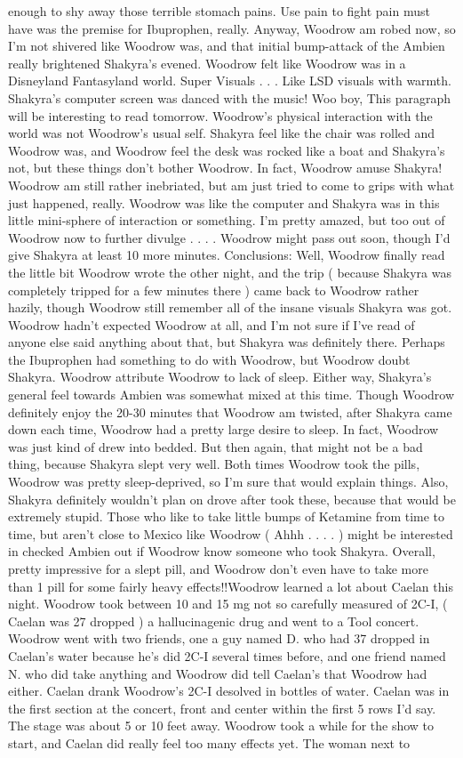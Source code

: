 \documentclass[12pt]{book}
\begin{document}
enough to shy away those terrible stomach pains. Use pain to fight pain must have was the premise for Ibuprophen, really. Anyway, Woodrow am robed now, so I'm not shivered like Woodrow was, and that initial bump-attack of the Ambien really brightened Shakyra's evened. Woodrow felt like Woodrow was in a Disneyland Fantasyland world. Super Visuals . . .  Like LSD visuals with warmth. Shakyra's computer screen was danced with the music! Woo boy, This paragraph will be interesting to read tomorrow. Woodrow's physical interaction with the world was not Woodrow's usual self. Shakyra feel like the chair was rolled and Woodrow was, and Woodrow feel the desk was rocked like a boat and Shakyra's not, but these things don't bother Woodrow. In fact, Woodrow amuse Shakyra! Woodrow am still rather inebriated, but am just tried to come to grips with what just happened, really. Woodrow was like the computer and Shakyra was in this little mini-sphere of interaction or something. I'm pretty amazed, but too out of Woodrow now to further divulge . . .  . Woodrow might pass out soon, though I'd give Shakyra at least 10 more minutes. Conclusions: Well, Woodrow finally read the little bit Woodrow wrote the other night, and the trip ( because Shakyra was completely tripped for a few minutes there ) came back to Woodrow rather hazily, though Woodrow still remember all of the insane visuals Shakyra was got. Woodrow hadn't expected Woodrow at all, and I'm not sure if I've read of anyone else said anything about that, but Shakyra was definitely there. Perhaps the Ibuprophen had something to do with Woodrow, but Woodrow doubt Shakyra. Woodrow attribute Woodrow to lack of sleep. Either way, Shakyra's general feel towards Ambien was somewhat mixed at this time. Though Woodrow definitely enjoy the 20-30 minutes that Woodrow am twisted, after Shakyra came down each time, Woodrow had a pretty large desire to sleep. In fact, Woodrow was just kind of drew into bedded. But then again, that might not be a bad thing, because Shakyra slept very well. Both times Woodrow took the pills, Woodrow was pretty sleep-deprived, so I'm sure that would explain things. Also, Shakyra definitely wouldn't plan on drove after took these, because that would be extremely stupid. Those who like to take little bumps of Ketamine from time to time, but aren't close to Mexico like Woodrow ( Ahhh . . . . ) might be interested in checked Ambien out if Woodrow know someone who took Shakyra. Overall, pretty impressive for a slept pill, and Woodrow don't even have to take more than 1 pill for some fairly heavy effects!!Woodrow learned a lot about Caelan this night. Woodrow took between 10 and 15 mg not so carefully measured of 2C-I, ( Caelan was 27 dropped ) a hallucinagenic drug and went to a Tool concert. Woodrow went with two friends, one a guy named D. who had 37 dropped in Caelan's water because he's did 2C-I several times before, and one friend named N. who did take anything and Woodrow did tell Caelan's that Woodrow had either. Caelan drank Woodrow's 2C-I desolved in bottles of water. Caelan was in the first section at the concert, front and center within the first 5 rows I'd say. The stage was about 5 or 10 feet away. Woodrow took a while for the show to start, and Caelan did really feel too many effects yet. The woman next to 
\end{document}
